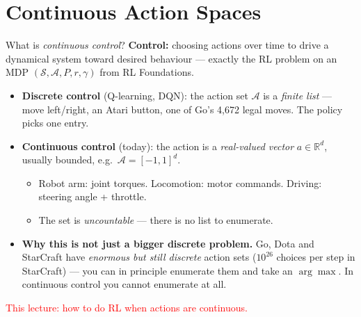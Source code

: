 \section{Continuous Action Spaces}

\begin{frame}{What is \emph{continuous control}?}
\vspace{0.6em}
\textbf{Control:} choosing actions over time to drive a dynamical system toward desired behaviour --- exactly the RL problem on an MDP $(\mathcal{S},\mathcal{A},P,r,\gamma)$ from RL Foundations.
\vspace{0.6em}
\begin{itemize}
    \item \textbf{Discrete control} (Q-learning, DQN): the action set $\mathcal{A}$ is a \emph{finite list} --- move left/right, an Atari button, one of Go's 4{,}672 legal moves. The policy picks one entry.
    \vspace{0.3em}
    \item \textbf{Continuous control} (today): the action is a \emph{real-valued vector} $a \in \mathbb{R}^{d}$, usually bounded, e.g.\ $\mathcal{A} = [-1,1]^{d}$.
    \begin{itemize}
        \footnotesize
        \item Robot arm: joint torques. \quad Locomotion: motor commands. \quad Driving: steering angle + throttle.
        \item The set is \emph{uncountable} --- there is no list to enumerate.
    \end{itemize}
    \pause
    \vspace{0.5em}
    \item \textbf{Why this is not just a bigger discrete problem.} Go, Dota and StarCraft have \emph{enormous but still discrete} action sets ($10^{26}$ choices per step in StarCraft) --- you can in principle enumerate them and take an $\arg\max$. In continuous control you cannot enumerate at all.
\end{itemize}
\vspace{0.4em}
\centering\footnotesize\textcolor{red}{This lecture: how to do RL when actions are continuous.}
\end{frame}
